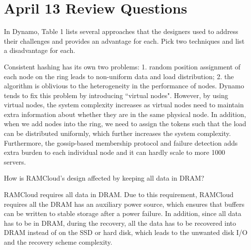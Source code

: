 \section{April 13 Review Questions}
\begin{QandA}
   \item  In Dynamo, Table 1 lists several approaches that the designers used to address their challenges and provides an advantage for each. Pick two techniques and list a disadvantage for each.
         \begin{answered}
         Consistent hashing has its own two problems: 1. random position assignment of each node on the ring leads to non-uniform data and load
         distribution; 2. the algorithm is oblivious to the heterogeneity in the performance of nodes. Dynamo tends to fix this problem by introducing
         ``virtual nodes". However, by using virtual nodes, the system complexity increases as virtual nodes need to maintain extra information
         about whether they are in the same physical node. In addition, when we add nodes into the ring, we need to assign the tokens such that
         the load can be distributed uniformly, which further increases the system complexity. Furthermore, the gossip-based membership protocol
         and failure detection adds extra burden to each individual node and it can hardly scale to more 1000 servers.
         \end{answered}

   \item  How is RAMCloud's design affected by keeping all data in DRAM?
         \begin{answered}
         RAMCloud requires all data in DRAM. Due to this requirement, RAMCloud requires all the DRAM has an auxiliary power source, which ensures
         that buffers can be written to stable storage after a power failure. In addition, since all data has to be in DRAM, during the recovery,
         all the data has to be recovered into DRAM instead of on the SSD or hard disk, which leads to the unwanted disk I/O and the recovery scheme
         complexity.
         \end{answered}
\end{QandA}




